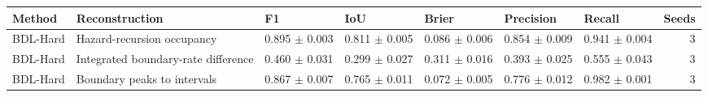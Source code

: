 \begin{tabular}{lllllllr}
\toprule
Method & Reconstruction & F1 & IoU & Brier & Precision & Recall & Seeds \\
\midrule
BDL-Hard & Hazard-recursion occupancy & 0.895 $\pm$ 0.003 & 0.811 $\pm$ 0.005 & 0.086 $\pm$ 0.006 & 0.854 $\pm$ 0.009 & 0.941 $\pm$ 0.004 & 3 \\
BDL-Hard & Integrated boundary-rate difference & 0.460 $\pm$ 0.031 & 0.299 $\pm$ 0.027 & 0.311 $\pm$ 0.016 & 0.393 $\pm$ 0.025 & 0.555 $\pm$ 0.043 & 3 \\
BDL-Hard & Boundary peaks to intervals & 0.867 $\pm$ 0.007 & 0.765 $\pm$ 0.011 & 0.072 $\pm$ 0.005 & 0.776 $\pm$ 0.012 & 0.982 $\pm$ 0.001 & 3 \\
\bottomrule
\end{tabular}
